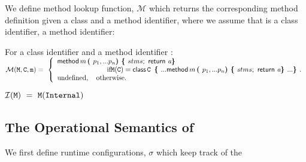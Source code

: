 We define  method lookup function, $\mathcal{M}$ which returns the corresponding method definition given a class and a method identifier, where we assume that  is a class identifier,    a method identifier: $ ~ $ \\

  
 \begin{definition}[Lookup]For a class identifier   and a method identifier  : $ ~ $ \\

\noindent
$
\Meths {} {\prg{C}} {m}      =  \ \left\{  
\begin{array}{l}
                          \kw{method}\, m\, \lp p_1, ... p_n \rp \lb stms \semi\, \kw{return}\ {\syntax{a}} \rb\\
\hspace{1in} \mbox{if}  \M(\prg{C}) =   
\kw{class}\, \prg{C}\, \  \lb ...   \kw{method}\, m\, \lp p_1, ... p_n \rp \lb stms \semi\, \kw{return}\ {\syntax{a}} \rb  ... \rb.  
\\
\mbox{undefined},  \ \ \ \mbox{otherwise.}
\end{array}
                    \right.$
 
${\mathcal{ I}} ( {\M} ) \    =  \     \M(\prg{Internal} )$
  \end{definition}

\subsection{The Operational Semantics of \LangOO}
\label{formal:semantics}

We first define runtime configurations, $\sigma$ which keep track of the 


